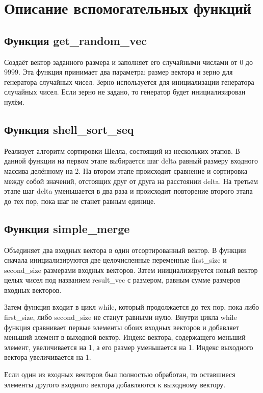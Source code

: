 \documentclass{article}
\begin{document}
\newpage
\section{Описание вспомогательных функций}

\subsection{Функция get\_random\_vec} Создаёт вектор заданного размера и заполняет его случайными числами от 0 до 9999. Эта функция принимает два параметра: размер вектора и зерно для генератора случайных чисел. Зерно используется для инициализации генератора случайных чисел. Если зерно не задано, то генератор будет инициализирован нулём.

\subsection{Функция shell\_sort\_seq} Реализует алгоритм сортировки Шелла, состоящий из нескольких этапов. В данной функции на первом этапе выбирается шаг delta равный размеру входного массива делённому на 2. На втором этапе происходит сравнение и сортировка между собой значений, отстоящих друг от друга на расстоянии delta. На третьем этапе шаг delta уменьшается в два раза и происходит повторение второго этапа до тех пор, пока шаг не станет равным единице.

\subsection{Функция simple\_merge} Объединяет два входных вектора в один отсортированный вектор. В функции сначала инициализируются две целочисленные переменные first\_size и second\_size размерами входных векторов. Затем инициализируется новый вектор целых чисел под названием result\_vec с размером, равным сумме размеров входных векторов.

Затем функция входит в цикл while, который продолжается до тех пор, пока либо first\_size, либо second\_size не станут равными нулю. Внутри цикла while функция сравнивает первые элементы обоих входных векторов и добавляет меньший элемент в выходной вектор. Индекс вектора, содержащего меньший элемент, увеличивается на 1, а его размер уменьшается на 1. Индекс выходного вектора увеличивается на 1.

Если один из входных векторов был полностью обработан, то оставшиеся элементы другого входного вектора добавляются к выходному вектору.
\end{document}
